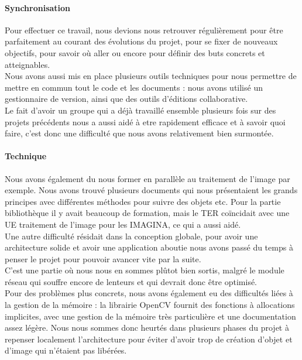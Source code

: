 \documentclass{report}
\begin{document}
		\paragraph{Synchronisation \\}
		Pour effectuer ce travail, nous devions nous retrouver régulièrement pour être parfaitement au courant des évolutions du projet, pour se fixer de nouveaux objectifs, pour savoir où aller ou encore pour définir des buts concrets et atteignables. \\
		Nous avons aussi mis en place plusieurs outils techniques pour nous permettre de mettre en commun tout le code et les documents : nous avons utilisé un gestionnaire de version, ainsi que des outils d'éditions collaborative. \\
		Le fait d'avoir un groupe qui a déjà travaillé ensemble plusieurs fois sur des projets précédents nous a aussi aidé à etre rapidement efficace et à savoir quoi faire, c'est donc une difficulté que nous avons relativement bien surmontée. \\
		
		\paragraph{Technique \\}
		Nous avons également du nous former en parallèle au traitement de l'image par exemple. Nous avons trouvé plusieurs documents qui nous présentaient les grands principes avec différentes méthodes pour suivre des objets etc. Pour la partie bibliothèque il y avait beaucoup de formation, mais le TER coïncidait avec une UE traitement de l'image pour les IMAGINA, ce qui a aussi aidé. \\
		Une autre difficulté résidait dans la conception globale, pour avoir une architecture solide et avoir une application aboutie nous avons passé du temps à penser le projet pour pouvoir avancer vite par la suite. \\ C'est une partie où nous nous en sommes plûtot bien sortis, malgré le module réseau qui souffre encore de lenteurs et qui devrait donc être optimisé. \\
		
		Pour des problèmes plus concrets, nous avons également eu des difficultés liées à la gestion de la mémoire : la librairie OpenCV fournit des fonctions à allocations implicites, avec une gestion de la mémoire très particulière et une documentation assez légère. Nous nous sommes donc heurtés dans plusieurs phases du projet à repenser localement l'architecture pour éviter d'avoir trop de création d'objet et d'image qui n'étaient pas libérées. \\
		\newpage
\end{document}
